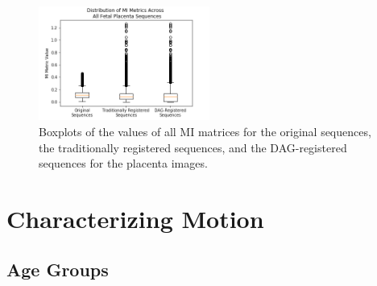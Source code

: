\begin{figure}
\centering
\includegraphics[width=0.5\textwidth]{6/figures/fetal-placenta-mi-box.png}
\caption{Boxplots of the values of all MI matrices for the original sequences, the traditionally registered sequences, and the DAG-registered sequences for the placenta images.}
\label{fig:fetal-placenta-mi-box}
\end{figure}

\section{Characterizing Motion}

\subsection{Age Groups}


